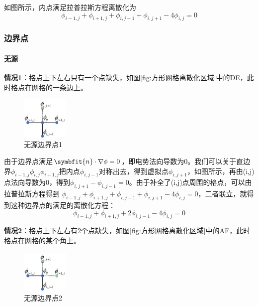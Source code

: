 \documentclass[10pt, a4paper]{article}
\newcommand\vbf{\symbfit}
\begin{document}
    如图所示，内点满足拉普拉斯方程离散化为
    \[\phi_{i-1,j}+\phi_{i+1,j}+\phi_{i,j-1}+\phi_{i,j+1}-4\phi_{i,j}=0\]

    \subsubsection{边界点}

    \paragraph{无源}

    \textbf{情况1}：格点上下左右只有一个点缺失，如图\ref{fig:方形网格离散化区域}中的DE，此时格点在网格的一条边上。

    \begin{figure}[H]
        \centering
        \includegraphics[width=0.2\textwidth]{无源边界点1.png}
        \caption{无源边界点1}\label{fig:无源边界点1}
    \end{figure}

    由于边界点满足$\vbf{n}\cdot \nabla\phi=0$，即电势法向导数为0。我们可以关于直边界$\phi_{i-1,j}\phi_{i,j}\phi_{i+1,j}$把内点$\phi_{i,j-1}$对称出去，得到虚拟点$\phi_{i,j+1}$，如图所示，再由(i,j)点法向导数为0，得到$\phi_{i,j+1}-\phi_{i,j-1}=0$。由于补全了(i,j)点周围的格点，可以由拉普拉斯方程得到
    $\phi_{i-1,j}+\phi_{i+1,j}+\phi_{i,j-1}+\phi_{i,j+1}-4\phi_{i,j}=0$，二者联立，就得到这种边界点的满足的离散化方程：
    \[\phi_{i-1,j}+\phi_{i+1,j}+2\phi_{i,j-1}-4\phi_{i,j}=0\]

    \textbf{情况2}：格点上下左右有2个点缺失，如图\ref{fig:方形网格离散化区域}中的AF，此时格点在网格的某个角上。

    \begin{figure}[H]
        \centering
        \includegraphics[width=0.2\textwidth]{无源边界点2.png}
        \caption{无源边界点2}\label{fig:无源边界点2}
    \end{figure}
\end{document}
